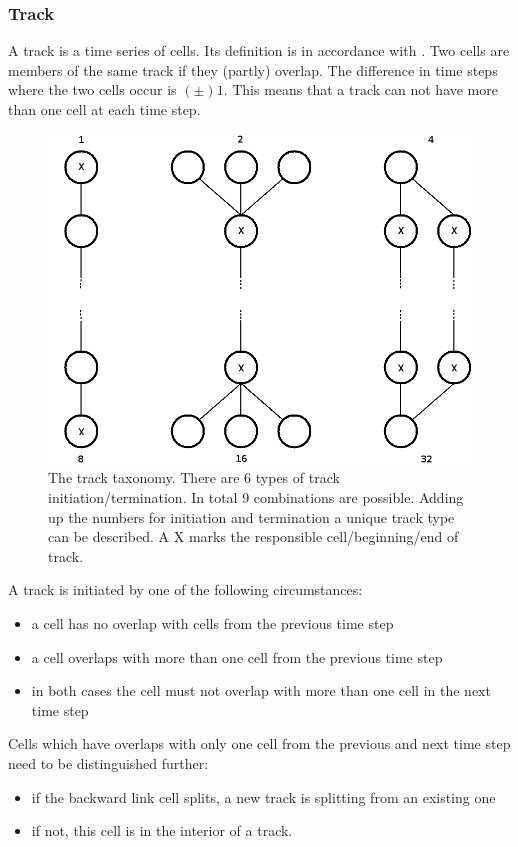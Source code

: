 \documentclass{scrartcl}
\begin{document}
\subsubsection*{Track}
A track is a time series of cells. Its definition is in accordance with \cite{moseley2013}. Two cells are members of the same track if they (partly) overlap. The difference in time steps where the two cells occur is $(\pm)1$. This means that a track can not have more than one cell at each time step. 
\begin{figure}[h]
	\centering
	\includegraphics[width=.8\linewidth]{trackinitterm}
	\caption{The track taxonomy. There are 6 types of track initiation/termination. In total 9 combinations are possible. Adding up the numbers for initiation and termination a unique track type can be described. A X marks the responsible cell/beginning/end of track.}
	\label{trackinitterm}
\end{figure}
A track is initiated by one of the following circumstances:
\begin{itemize}
	\item a cell has no overlap with cells from the previous time step
	\item a cell overlaps with more than one cell from the previous time step
	\item in both cases the cell must not overlap with more than one cell in the next time step
\end{itemize}
Cells which have overlaps with only one cell from the previous and next time step need to be distinguished further:
\begin{itemize}
	\item if the backward link cell splits, a new track is splitting from an existing one
	\item if not, this cell is in the interior of a track.
\end{itemize}
\end{document}
